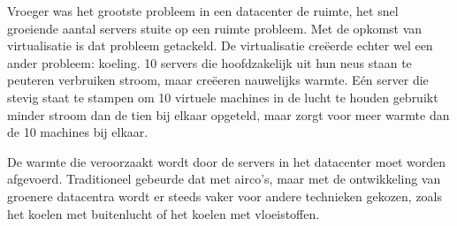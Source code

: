 Vroeger was het grootste probleem in een datacenter de ruimte, het snel groeiende aantal servers stuite op een ruimte probleem. Met de opkomst van virtualisatie is dat probleem getackeld. De virtualisatie cre\"eerde echter wel een ander probleem: koeling. 10 servers die hoofdzakelijk uit hun neus staan te peuteren verbruiken stroom, maar cre\"eeren nauwelijks warmte. E\'en server die stevig staat te stampen om 10 virtuele machines in de lucht te houden gebruikt minder stroom dan de tien bij elkaar opgeteld, maar zorgt voor meer warmte dan de 10 machines bij elkaar.

De warmte die veroorzaakt wordt door de servers in het datacenter moet worden afgevoerd. Traditioneel gebeurde dat met airco's, maar met de ontwikkeling van groenere datacentra wordt er steeds vaker voor andere technieken gekozen, zoals het koelen met buitenlucht of het koelen met vloeistoffen.

